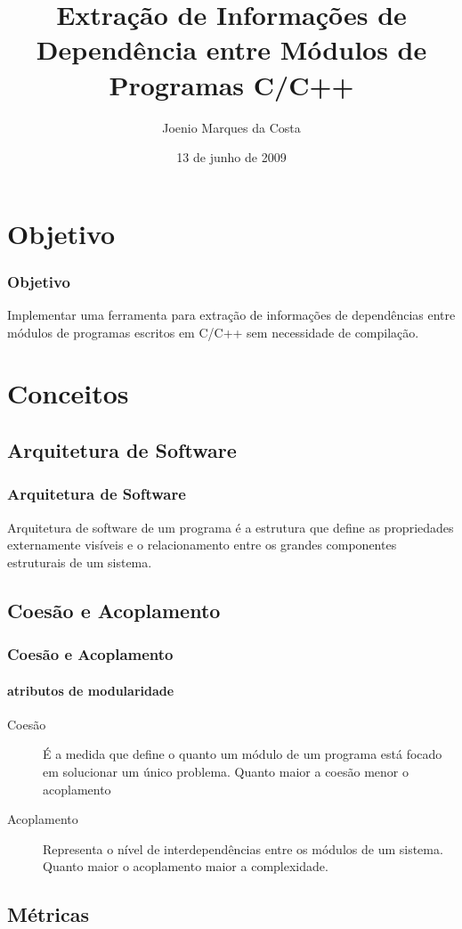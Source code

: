 \documentclass{beamer}
\title[Universidade Católica do Salvador]{Extração de Informações de Dependência entre Módulos de Programas C/C++}
\author[Joenio Costa]{Joenio Marques da Costa}
\institute{UCSal - Universidade Católica do Salvador}
\date{13 de junho de 2009}
\begin{document}
\frame{\titlepage} %

\begin{frame}
 \tableofcontents
\end{frame}

\section{Objetivo}

\begin{frame}
\frametitle{Objetivo}
 Implementar uma ferramenta para extração de informações de dependências
 entre módulos de programas escritos em C/C++ sem necessidade de compilação.
\end{frame}

\section{Conceitos}

\subsection{Arquitetura de Software}

\begin{frame}
\frametitle{Arquitetura de Software}
 Arquitetura de software de um programa é a estrutura que define as propriedades
 externamente visíveis e o relacionamento entre os grandes componentes
 estruturais de um sistema.
\end{frame}

\subsection{Coesão e Acoplamento}

\begin{frame}
\frametitle{Coesão e Acoplamento}
\framesubtitle{atributos de modularidade}
 \begin{description}
 \item[Coesão]É a medida que define o quanto um módulo de um programa está
 focado em solucionar um único problema. Quanto maior a coesão menor o
 acoplamento
 \item[Acoplamento]Representa o nível de interdependências entre os módulos de
 um sistema. Quanto maior o acoplamento maior a complexidade.
 \end{description}
\end{frame}

\subsection{Métricas}
\end{document}

